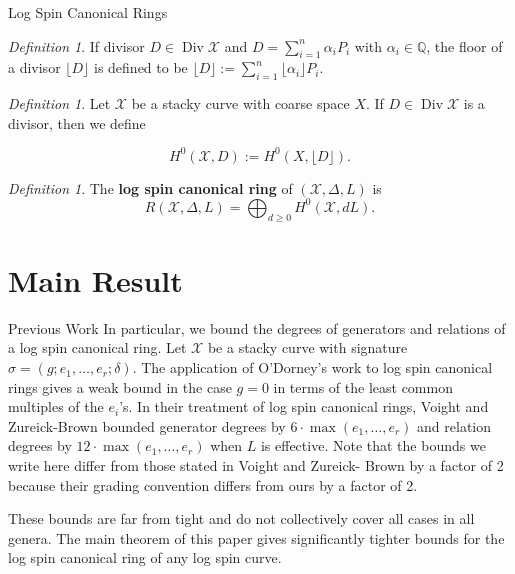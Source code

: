 \documentclass{beamer}
\theoremstyle{remark}
\newtheorem{defn}[thm]{Definition}
\newcommand\BQ{{\mathbb Q}}
\newcommand \sx{{\mathscr X}}
\DeclareMathOperator\di{Div}
\newcommand{\halfcan}{L}
\begin{document}

\begin{frame}{Log Spin Canonical Rings}

\begin{defn}
If divisor $D \in \di \sx$ and $D = \sum_{i = 1}^{n} \alpha_i P_i$
with $\alpha_i \in \BQ$, the floor of a divisor $\lfloor D
\rfloor$ is defined to be $\lfloor D \rfloor := \sum_{i = 1}^{n}
\lfloor \alpha_i \rfloor P_i$.
\end{defn}

\pause
\begin{defn}
Let $\sx$ be a stacky curve with coarse space $X$.
If $D \in \di \sx$ is a divisor, then we define

\[
	H^0(\sx, D) := H^0(X, \lfloor D \rfloor).
\]
\end{defn}

\pause
\begin{defn}
The {\bf log spin canonical ring} of $(\sx, \Delta, \halfcan)$ is
\[
	R(\sx, \Delta, \halfcan) = \bigoplus_{d \geq 0} H^0(\sx, d \halfcan).
\]
\end{defn}

\end{frame}

\section{Main Result}

\begin{frame}{Previous Work}
In particular, we bound the degrees of generators and relations of
a log spin canonical ring. Let $\sx$ be a stacky curve with
signature $\sigma = (g; e_1, \ldots, e_r; \delta)$. The application
of O'Dorney's work \cite[Chapter 5]{dorney:canonical} to log spin
canonical rings gives a weak bound in the case $g = 0$ in terms of
the least common multiples of the $e_i$'s. In their treatment of
log spin canonical rings, Voight and Zureick-Brown
\cite[Corollary 10.4.6]{vzb:stacky} bounded generator degrees by $6
\cdot \max(e_1, \ldots, e_r)$ and relation degrees by $12 \cdot \max
(e_1, \ldots, e_ r)$ when $\halfcan$ is effective. Note that the
bounds we write here differ from those stated in Voight and Zureick-
Brown \cite[Corollary 10.4.6]{vzb:stacky} by a factor of 2 because
their grading convention differs from ours by a factor of 2.

These bounds are far from tight and do not collectively
cover all cases in all genera. The main theorem of this paper
gives significantly tighter bounds for the log spin canonical ring
of any log spin curve.
\end{frame}
\end{document}
